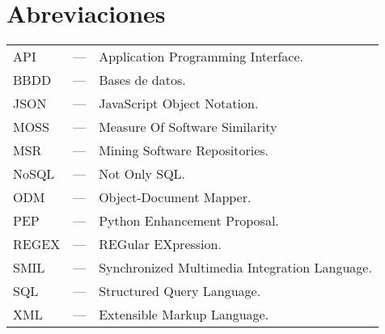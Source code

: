 
\chapter*{Abreviaciones}


\begin{tabular}{ l c l }
API   & --- & Application Programming Interface.\\
BBDD  & --- & Bases de datos.\\
JSON  & --- & JavaScript Object Notation.\\
MOSS  & --- & Measure Of Software Similarity\\
MSR   & --- & Mining Software Repositories.\\
NoSQL & --- & Not Only SQL.\\
ODM   & --- & Object-Document Mapper.\\
PEP   & --- & Python Enhancement Proposal.\\
REGEX & --- & REGular EXpression.\\
SMIL  & --- & Synchronized Multimedia Integration Language.\\
SQL   & --- & Structured Query Language.\\
XML   & --- & Extensible Markup Language.\\
\end{tabular}

